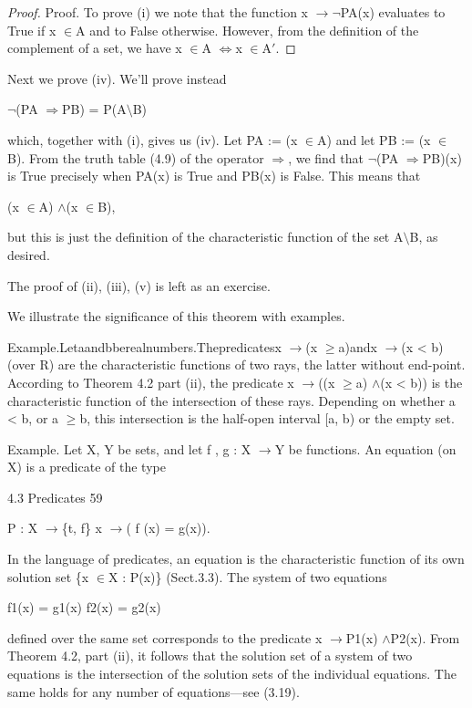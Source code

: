 \documentclass[11pt]{article}
\theoremstyle{plain}
\theoremstyle{definition}
\begin{document}
\begin{proof}
Proof. To prove (i) we note that the function x $\to$$\neg$PA(x) evaluates to True if x $\in$A and to False otherwise. However, from the definition of the complement of a set, we have x $\in$A $\Leftrightarrow$x $\in$A$'$.
\end{proof}

Next we prove (iv). We'll prove instead

$\neg$(PA $\Rightarrow$PB) = P(A$\setminus$B)

which, together with (i), gives us (iv). Let PA := (x $\in$A) and let PB := (x $\in$ B). From the truth table (4.9) of the operator $\Rightarrow$, we find that $\neg$(PA $\Rightarrow$PB)(x) is True precisely when PA(x) is True and PB(x) is False. This means that

(x $\in$A) $\land$(x $\in$B),

but this is just the definition of the characteristic function of the set A$\setminus$B, as desired.

The proof of (ii), (iii), (v) is left as an exercise. 

We illustrate the significance of this theorem with examples.

Example.Letaandbberealnumbers.Thepredicatesx $\to$(x $\geq$a)andx $\to$(x < b) (over R) are the characteristic functions of two rays, the latter without end-point. According to Theorem 4.2 part (ii), the predicate x $\to$((x $\geq$a) $\land$(x < b)) is the characteristic function of the intersection of these rays. Depending on whether a < b, or a $\geq$b, this intersection is the half-open interval [a, b) or the empty set.

Example. Let X, Y be sets, and let f , g : X $\to$Y be functions. An equation (on X) is a predicate of the type

4.3 Predicates 59

P : X $\to$\{t, f\} x $\to$( f (x) = g(x)).

In the language of predicates, an equation is the characteristic function of its own solution set \{x $\in$X : P(x)\} (Sect.3.3). The system of two equations

f1(x) = g1(x) f2(x) = g2(x)

defined over the same set corresponds to the predicate x $\to$P1(x) $\land$P2(x). From Theorem 4.2, part (ii), it follows that the solution set of a system of two equations is the intersection of the solution sets of the individual equations. The same holds for any number of equations---see (3.19).
\end{document}

